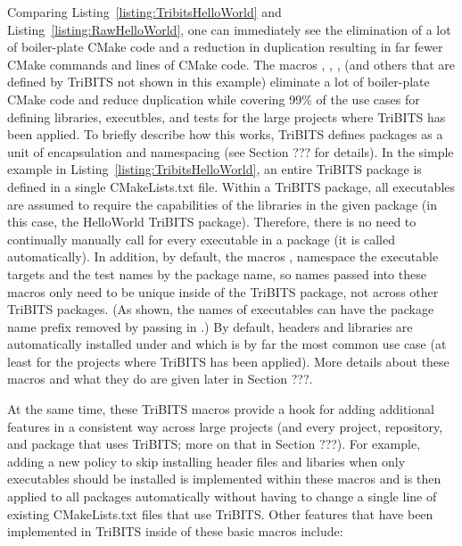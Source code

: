 \documentclass[10pt]{article}
\begin{document}
Comparing Listing~\ref{listing:TribitsHelloWorld} and Listing~\ref{listing:RawHelloWorld}, one can immediately see the elimination of a lot of boiler-plate CMake code and a reduction in duplication resulting in far fewer CMake commands and lines of CMake code.  The macros , , ,  (and others that are defined by TriBITS not shown in this example) eliminate a lot of boiler-plate CMake code and reduce duplication while covering 99\% of the use cases for defining libraries, executbles, and tests for the large projects where TriBITS has been applied.  To briefly describe how this works, TriBITS defines packages as a unit of encapsulation and namespacing (see Section ??? for details).  In the simple example in Listing~\ref{listing:TribitsHelloWorld}, an entire TriBITS package is defined in a single CMakeLists.txt file.  Within a TriBITS package, all executables are assumed to require the capabilities of the libraries in the given package (in this case, the HelloWorld TriBITS package).  Therefore, there is no need to continually manually call  for every executable in a package (it is called automatically).  In addition, by default, the macros ,  namespace the executable targets and the test names by the package name, so names passed into these macros only need to be unique inside of the TriBITS package, not across other TriBITS packages.  (As shown, the names of executables can have the package name prefix removed by passing in .)  By default, headers and libraries are automatically installed under  and  which is by far the most common use case (at least for the projects where TriBITS has been applied).  More details about these macros and what they do are given later in Section ???.

At the same time, these TriBITS macros provide a hook for adding additional features in a consistent way across large projects (and every project, repository, and package that uses TriBITS; more on that in Section ???).  For example, adding a new policy to skip installing header files and libaries when only executables should be installed is implemented within these macros and is then applied to all packages automatically without having to change a single line of existing CMakeLists.txt files that use TriBITS.  Other features that have been implemented in TriBITS inside of these basic macros include:
\end{document}
